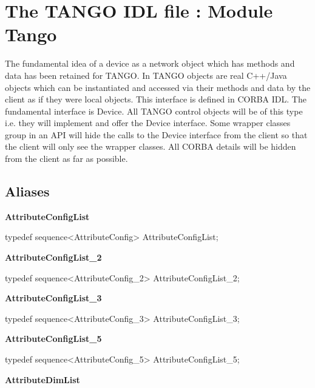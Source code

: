 
\chapter{The TANGO IDL file : Module Tango}

The fundamental idea of a device as a network object which has methods
and data has been retained for TANGO. In TANGO objects are real C++/Java
objects which can be instantiated and accessed via their methods and
data by the client as if they were local objects. This interface is
defined in CORBA IDL. The fundamental interface is Device. All TANGO
control objects will be of this type i.e. they will implement and
offer the Device interface. Some wrapper classes group in an API will
hide the calls to the Device interface from the client so that the
client will only see the wrapper classes. All CORBA details will be
hidden from the client as far as possible.

\section{Aliases}

\textbf{AttributeConfigList}

typedef sequence<AttributeConfig> AttributeConfigList;\\

\begin{flushleft}
\textbf{AttributeConfigList\_2}
\par\end{flushleft}

typedef sequence<AttributeConfig\_2> AttributeConfigList\_2;\\

\begin{flushleft}
\textbf{AttributeConfigList\_3}
\par\end{flushleft}

typedef sequence<AttributeConfig\_3> AttributeConfigList\_3;\\

\begin{flushleft}
\textbf{AttributeConfigList\_5}
\par\end{flushleft}

typedef sequence<AttributeConfig\_5> AttributeConfigList\_5;\\

\begin{flushleft}
\textbf{AttributeDimList}
\par\end{flushleft}

